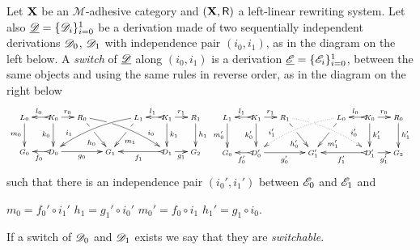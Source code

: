 \begin{definition}[Switch] \label{def:switch}
	Let $\textbf {\textup{X}}$ be an $\mathcal{M}$-adhesive category 
	and $(\textbf {\textup{X}}, \mathsf{R})$ a left-linear rewriting system. 
	Let also
	$\underline{\mathscr{D}}=\{\mathscr{D}_i\}_{i=0}^1$ be a derivation made
	of two sequentially independent derivations $\mathscr{D}_0$,
	$\mathscr{D}_1$ with independence pair $(i_0, i_1)$, as in the diagram
	on the left below. A \emph{switch} of $\underline{\mathscr{D}}$ along $(i_0,i_1)$ is
	a derivation $\underline{\mathscr{E}}=\{\mathscr{E}_i\}_{i=0}^1$, between the same objects and using the same rules
	in reverse order, as in the diagram on the right below
	\[
	\def\objectstyle{\scriptstyle}\def\labelstyle{\scriptstyle}
	\xymatrix@C=1.1mm@R=8mm{
		{L_0} \ar[d]_{m_0}
		& & {K_0} \ar@{>->}[ll]_{l_0} \ar[rr]^{r_0} \ar[d]_{k_0}
		& & {R_0} \ar[drr]|(.35)\hole_(.6){h_0}  \ar@/^.22cm/[drrrrrr]|(.3)\hole^(.75){i_0}
		& & & & 
		{L_1}\ar[dll]|(.35)\hole^(.6){m_1} \ar@/_.22cm/_(.75){i_1}[dllllll]
		& & {K_1} \ar@{>->}[ll]_{l_1} \ar[rr]^{r_1} \ar[d]^{k_1}
		& & {R_1} \ar[d]^{h_1} \\
		{G_0}
		& & {D_0} \ar@{>->}[ll]^{f_0} \ar[rrrr]_{g_0}
		& & & & {G_1} & &
		& &  {D_1} \ar@{>->}[llll]^{f_1} \ar[rr]_{g_1}
		& & {G_2}
	}
	\xymatrix@C=1.1mm@R=8mm{
		{L_1} \ar[d]_{m_0'}
		& & {K_1} \ar@{>->}[ll]_{l_1} \ar[rr]^{r_1} \ar[d]_{k_0'}
		& & {R_1} \ar[drr]|(.35)\hole_(.6){h_0'}  \ar@/^.22cm/@{.>}^(.75){i_0'}|(.3)\hole[drrrrrr]
		& & & & 
		{L_0}\ar[dll]|(.35)\hole^(.6){m_1'} \ar@/_.22cm/@{.>}_(.75){i_1'}[dllllll] 
		& & {K_0} \ar@{>->}[ll]_{l_0} \ar[rr]^{r_0} \ar[d]^{k_1'}
		& & {R_0} \ar[d]^{h_1'} \\
		{G_0}
		& & {D_0'} \ar@{>->}[ll]^{f_0'} \ar[rrrr]_{g_0'}
		& & & & {G'_1} & &
		& &  {D_1'} \ar@{>->}[llll]^{f_1'} \ar[rr]_{g_1'}
		& & {G_2}  }
	\]
	such that there is an independence pair $(i_0', i_1')$ between
	$\mathscr{E}_0$ and $\mathscr{E}_1$ and 
	\begin{center}   
		$m_0=f_0' \circ i_1'$
		\qquad $h_1=g_1' \circ i_0'$
		\qquad $m_0'= f_0 \circ i_1$
		\qquad $h_1'= g_{1}\circ i_0$.
	\end{center}
	
	If a switch of $\mathscr{D}_0$ and $\mathscr{D}_1$ exists we say that
	they are \emph{switchable}.
\end{definition}

